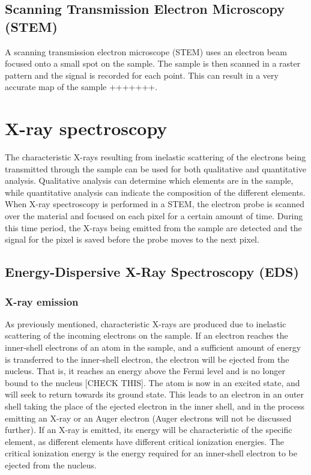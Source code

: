 
	\subsection{Scanning Transmission Electron Microscopy (STEM)}
A scanning transmission electron microscope (STEM) uses an electron beam focused onto a small spot on the sample. The sample is then scanned in a raster pattern and the signal is recorded for each point. This can result in a very accurate map of the sample +++++++. 

\section{X-ray spectroscopy}\label{EDS}
The characteristic X-rays resulting from inelastic scattering of the electrons being transmitted through the sample can be used for both qualitative and quantitative analysis. Qualitative analysis can determine which elements are in the sample, while quantitative analysis can indicate the composition of the different elements. When X-ray spectroscopy is performed in a STEM, the electron probe is scanned over the material and focused on each pixel for a certain amount of time. During this time period, the X-rays being emitted from the sample are detected and the signal for the pixel is saved before the probe moves to the next pixel. 

	\subsection{Energy-Dispersive X-Ray Spectroscopy (EDS)} %
		\subsubsection{X-ray emission}
As previously mentioned, characteristic X-rays are produced due to inelastic scattering of the incoming electrons on the sample. If an electron reaches the inner-shell electrons of an atom in the sample, and a sufficient amount of energy is transferred to the inner-shell electron, the electron will be ejected from the nucleus. That is, it reaches an energy above the Fermi level and is no longer bound to the nucleus [CHECK THIS]. The atom is now in an excited state, and will seek to return towards its ground state. This leads to an electron in an outer shell taking the place of the ejected electron in the inner shell, and in the process emitting an X-ray or an Auger electron (Auger electrons will not be discussed further). If an X-ray is emitted, its energy will be characteristic of the specific element, as different elements have different critical ionization energies. The critical ionization energy is the energy required for an inner-shell electron to be ejected from the nucleus.

